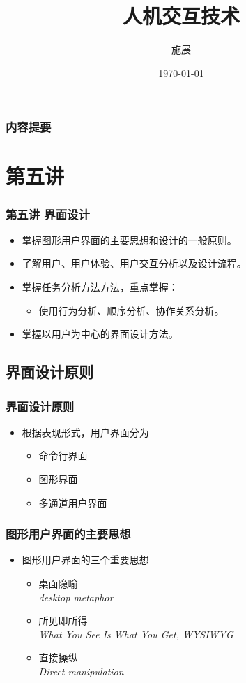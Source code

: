 \documentclass{beamer}
\title{人机交互技术}
\author{施展}
\institute{华中科技大学~武汉光电国家实验室}
\date{\today}
\begin{document}
\begin{frame}
	\titlepage
\end{frame}

\begin{frame}
	\frametitle{内容提要}
	\tableofcontents
\end{frame}

\section{第五讲}
\begin{frame}
	\frametitle{第五讲 界面设计}
	\begin{itemize}
		\item 掌握图形用户界面的主要思想和设计的一般原则。
		\item 了解用户、用户体验、用户交互分析以及设计流程。
		\item 掌握任务分析方法方法，重点掌握：
		\begin{itemize}
			\item 使用行为分析、顺序分析、协作关系分析。
		\end{itemize}
		\item 掌握以用户为中心的界面设计方法。
	\end{itemize}
\end{frame}

\subsection{界面设计原则}
\begin{frame}
	\frametitle{界面设计原则}
	\begin{itemize}
		\item 根据表现形式，用户界面分为
		\begin{itemize}
			\item 命令行界面
			\item 图形界面
			\item 多通道用户界面
		\end{itemize}
	\end{itemize}
\end{frame}

\begin{frame}
	\frametitle{图形用户界面的主要思想}
	\begin{itemize}
		\item 图形用户界面的三个重要思想
		\begin{itemize}
			\item 桌面隐喻\\\textit{desktop metaphor}
			\item 所见即所得\\\textit{What You See Is What You Get, WYSIWYG}
			\item 直接操纵\\\textit{Direct manipulation}
		\end{itemize}
	\end{itemize}
\end{frame}
\end{document}
